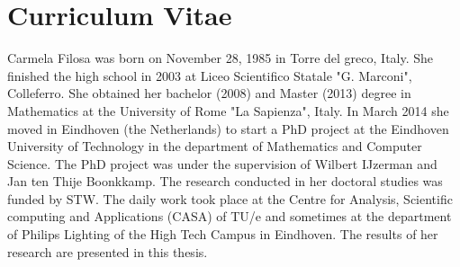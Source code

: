 \chapter*{Curriculum Vitae}
Carmela Filosa was born on November 28, 1985 in Torre del greco, Italy. She finished the high school in 2003 at Liceo Scientifico Statale "G. Marconi", Colleferro. She obtained her bachelor (2008) and Master (2013) degree in Mathematics at the University of Rome "La Sapienza", Italy. In March 2014 she moved in Eindhoven (the Netherlands) to start a PhD project at the Eindhoven University of Technology in the department of Mathematics and Computer Science. The PhD project was under the supervision of Wilbert IJzerman and Jan ten Thije Boonkkamp. The research conducted in her doctoral studies was funded by STW. The daily work took place at the Centre for Analysis, Scientific computing and Applications (CASA) of TU/e and sometimes at the department of Philips Lighting of the High Tech Campus in Eindhoven. 
The results of her research are presented in this thesis.  

